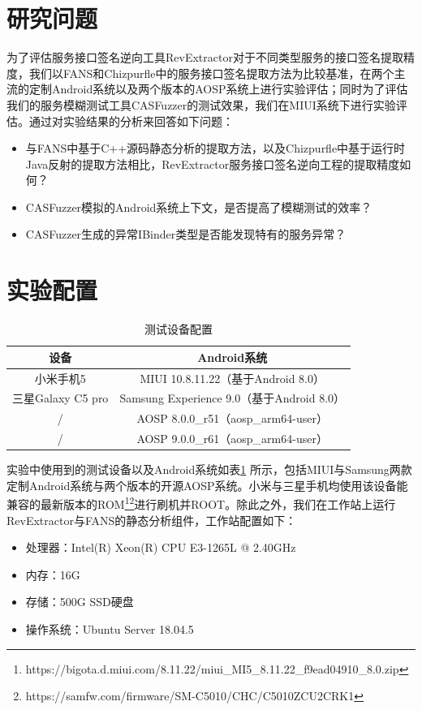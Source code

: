 \documentclass[winfonts,master,twoside]{njuthesis}
\begin{document}
\section{研究问题}

为了评估服务接口签名逆向工具RevExtractor对于不同类型服务的接口签名提取精度，我们以FANS和Chizpurfle中的服务接口签名提取方法为比较基准，在两个主流的定制Android系统以及两个版本的AOSP系统上进行实验评估；同时为了评估我们的服务模糊测试工具CASFuzzer的测试效果，我们在MIUI系统下进行实验评估。通过对实验结果的分析来回答如下问题：

\begin{itemize}
	\item 与FANS中基于C++源码静态分析的提取方法，以及Chizpurfle中基于运行时Java反射的提取方法相比，RevExtractor服务接口签名逆向工程的提取精度如何？
	\item CASFuzzer模拟的Android系统上下文，是否提高了模糊测试的效率？
	\item CASFuzzer生成的异常IBinder类型是否能发现特有的服务异常？
\end{itemize}

\section{实验配置}

\begin{table}[!htbp]
	\centering
	\begin{tabular}{cc}
		\toprule
		设备 & Android系统 \\
		\midrule
		小米手机5 & MIUI 10.8.11.22（基于Android 8.0）\\
		三星Galaxy C5 pro & Samsung Experience 9.0（基于Android 8.0）\\
		/ & AOSP 8.0.0\_r51（aosp\_arm64-user）\\
		/ & AOSP 9.0.0\_r61（aosp\_arm64-user）\\
		\bottomrule
	\end{tabular}
	\caption{测试设备配置}
	\label{tbl:device_list}
\end{table}

实验中使用到的测试设备以及Android系统如表\ref{tbl:device_list} 所示，包括MIUI与Samsung两款定制Android系统与两个版本的开源AOSP系统。小米与三星手机均使用该设备能兼容的最新版本的ROM\footnote{https://bigota.d.miui.com/8.11.22/miui\_MI5\_8.11.22\_f9ead04910\_8.0.zip}\footnote{https://samfw.com/firmware/SM-C5010/CHC/C5010ZCU2CRK1}进行刷机并ROOT。除此之外，我们在工作站上运行RevExtractor与FANS的静态分析组件，工作站配置如下：
\begin{itemize}
    \item 处理器：Intel(R) Xeon(R) CPU E3-1265L @ 2.40GHz
    \item 内存：16G
    \item 存储：500G SSD硬盘
    \item 操作系统：Ubuntu Server 18.04.5
\end{itemize}
\end{document}

